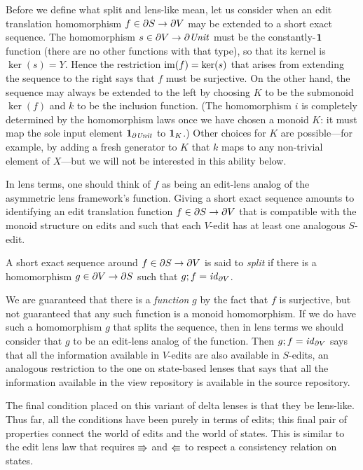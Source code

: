 Before we define what split and lens-like mean, let us consider when an
edit translation homomorphism $f \in \partial S \to \partial V$ may be extended to a short
exact sequence. The homomorphism $s \in \partial V \to \partial\mathit{Unit}$ must be the
constantly-$\mbox{\bf{1}}$ function (there are no other functions with that type), so
that its kernel is $\ker(s)=Y$. Hence the restriction $\mathrm{im}(f)=\ker(s)$ that
arises from extending the sequence to the right says that $f$ must be
surjective. On the other hand, the sequence may always be extended to the
left by choosing $K$ to be the submonoid $\ker(f)$ and $k$ to be the
inclusion function. (The homomorphism $i$ is completely determined by the
homomorphism laws once we have chosen a monoid $K$: it must map the sole
input element $\mbox{\bf{1}}_{\partial\mathit{Unit}}$ to $\mbox{\bf{1}}_K$.) Other choices for $K$ are
possible---for example, by adding a fresh generator to $K$ that $k$ maps to
any non-trivial element of $X$---but we will not be interested in this
ability below.

In lens terms, one should think of $f$ as being an edit-lens analog of the
asymmetric lens framework's \GET function. Giving a short exact sequence
amounts to identifying an edit translation function $f\in\partial S\to\partial V$ that is
compatible with the monoid structure on edits and such that each $V$-edit
has at least one analogous $S$-edit.

\begin{definition}
    A short exact sequence around $f\in\partial S\to\partial V$ is said to \emph{split} if
    there is a homomorphism $g\in\partial V\to\partial S$ such that $g;f = \mathit{id}_{\partial V}$.
\end{definition}

We are guaranteed that there is a \emph{function} $g$ by the fact that $f$
is surjective, but not guaranteed that any such function is a monoid
homomorphism. If we do have such a homomorphism $g$ that splits the
sequence, then in lens terms we should consider that $g$ to be an edit-lens
analog of the \PUT function. Then $g;f = \mathit{id}_{\partial V}$ says that all the
information available in $V$-edits are also available in $S$-edits, an
analogous restriction to the one on state-based lenses that says that all
the information available in the view repository is available in the source
repository.

The final condition placed on this variant of delta lenses is that they be
lens-like. Thus far, all the conditions have been purely in terms of edits;
this final pair of properties connect the world of edits and the world of
states. This is similar to the edit lens law that requires $\mathord{\Rrightarrow}$ and
$\mathord{\Lleftarrow}$ to respect a consistency relation on states.

